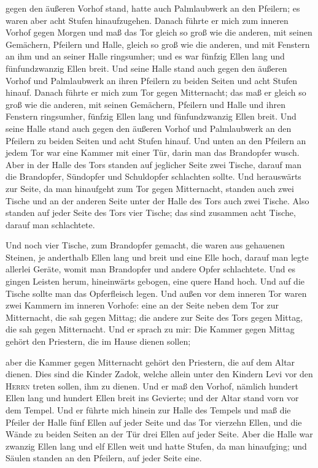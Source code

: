 gegen den äußeren Vorhof stand, hatte auch Palmlaubwerk an den Pfeilern;
es waren aber acht Stufen hinaufzugehen.  Danach führte
er mich zum inneren Vorhof gegen Morgen und maß das Tor gleich so groß
wie die anderen,  mit seinen Gemächern, Pfeilern und
Halle, gleich so groß wie die anderen, und mit Fenstern an ihm und an
seiner Halle ringsumher; und es war fünfzig Ellen lang und
fünfundzwanzig Ellen breit.  Und seine Halle stand auch
gegen den äußeren Vorhof und Palmlaubwerk an ihren Pfeilern zu beiden
Seiten und acht Stufen hinauf.  Danach führte er mich zum
Tor gegen Mitternacht; das maß er gleich so groß wie die anderen,
 mit seinen Gemächern, Pfeilern und Halle und ihren
Fenstern ringsumher, fünfzig Ellen lang und fünfundzwanzig Ellen breit.
 Und seine Halle stand auch gegen den äußeren Vorhof und
Palmlaubwerk an den Pfeilern zu beiden Seiten und acht Stufen hinauf.
 Und unten an den Pfeilern an jedem Tor war eine Kammer
mit einer Tür, darin man das Brandopfer wusch.  Aber in
der Halle des Tors standen auf jeglicher Seite zwei Tische, darauf man
die Brandopfer, Sündopfer und Schuldopfer schlachten sollte.
 Und herauswärts zur Seite, da man hinaufgeht zum Tor
gegen Mitternacht, standen auch zwei Tische und an der anderen Seite
unter der Halle des Tors auch zwei Tische.  Also standen
auf jeder Seite des Tors vier Tische; das sind zusammen acht Tische,
darauf man schlachtete.

 Und noch vier Tische, zum Brandopfer gemacht, die waren
aus gehauenen Steinen, je anderthalb Ellen lang und breit und eine Elle
hoch, darauf man legte allerlei Geräte, womit man Brandopfer und andere
Opfer schlachtete.  Und es gingen Leisten herum,
hineinwärts gebogen, eine quere Hand hoch. Und auf die Tische sollte man
das Opferfleisch legen.  Und außen vor dem inneren Tor
waren zwei Kammern im inneren Vorhofe: eine an der Seite neben dem Tor
zur Mitternacht, die sah gegen Mittag; die andere zur Seite des Tors
gegen Mittag, die sah gegen Mitternacht.  Und er sprach
zu mir: Die Kammer gegen Mittag gehört den Priestern, die im Hause
dienen sollen;

 aber die Kammer gegen Mitternacht gehört den Priestern,
die auf dem Altar dienen. Dies sind die Kinder Zadok, welche allein
unter den Kindern Levi vor den \textsc{Herrn} treten sollen, ihm zu
dienen.  Und er maß den Vorhof, nämlich hundert Ellen
lang und hundert Ellen breit ins Gevierte; und der Altar stand vorn vor
dem Tempel.  Und er führte mich hinein zur Halle des
Tempels und maß die Pfeiler der Halle fünf Ellen auf jeder Seite und das
Tor vierzehn Ellen, und die Wände zu beiden Seiten an der Tür drei Ellen
auf jeder Seite.  Aber die Halle war zwanzig Ellen lang
und elf Ellen weit und hatte Stufen, da man hinaufging; und Säulen
standen an den Pfeilern, auf jeder Seite eine.

